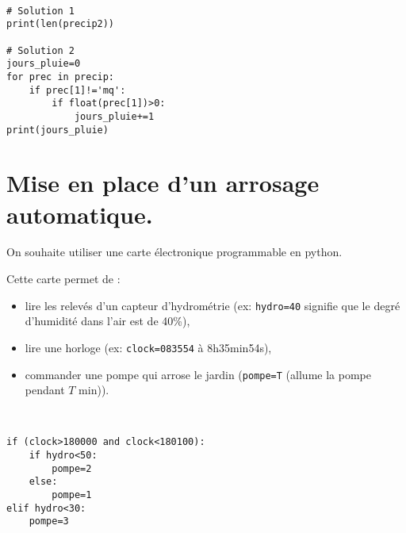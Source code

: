 \begin{solution}~\ \\
\begin{verbatim}
# Solution 1
print(len(precip2))

# Solution 2
jours_pluie=0
for prec in precip:
    if prec[1]!='mq':
        if float(prec[1])>0:
            jours_pluie+=1
print(jours_pluie)
\end{verbatim}
\end{solution}

\section{Mise en place d'un arrosage automatique.}

On souhaite utiliser une carte électronique programmable en python.

Cette carte permet de :
\begin{itemize}
 \item lire les relevés d'un capteur d'hydrométrie (ex: \verb?hydro=40? signifie que le degré d'humidité dans l'air est de 40\%),
 \item lire une horloge (ex: \verb?clock=083554? à 8h35min54s),
 \item commander une pompe qui arrose le jardin (\verb?pompe=T? (allume la pompe pendant $T$ min)).
\end{itemize}


\begin{solution}~\ \\
\begin{verbatim}
if (clock>180000 and clock<180100):
    if hydro<50:
        pompe=2
    else:
        pompe=1
elif hydro<30:
    pompe=3
\end{verbatim}
\end{solution}


